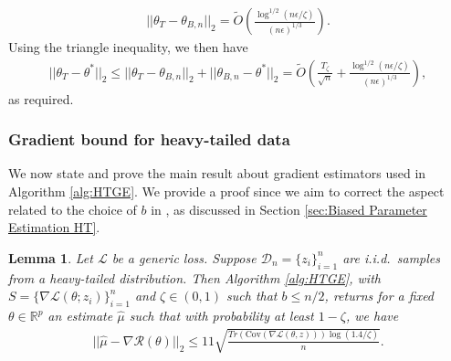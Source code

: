 \documentclass{article}
\newtheorem{lemma}{Lemma}
\newcommand{\iid}{i.i.d.{\ }}
\begin{document}
\begin{align*}
||\theta_T - \theta_{B, n}||_2 = \widetilde{O}\left(\frac{\log^{1/2}(n\epsilon/\zeta)}{(n\epsilon)^{1/3}}\right).
\end{align*}
Using the triangle inequality, we then have
\begin{align*}
||\theta_T - \theta^*||_2 \leq ||\theta_T - \theta_{B, n}||_2 + ||\theta_{B, n} - \theta^*||_2 = \widetilde{O}\left(\frac{T_\zeta}{\sqrt{n}} + \frac{\log^{1/2}(n\epsilon/\zeta)}{(n\epsilon)^{1/3}}\right),
\end{align*}
as required.


\subsubsection{Gradient bound for heavy-tailed data}
\label{AppLemHT}

We now state and prove the main result about gradient estimators used in Algorithm \ref{alg:HTGE}. We provide a proof since we aim to correct the aspect related to the choice of $b$ in \cite{RE}, as discussed in Section \ref{sec:Biased Parameter Estimation HT}.

\begin{lemma}
\label{lemma:htlemma}
Let $\mathcal{L}$ be a generic loss. Suppose $\mathcal{D}_n = \{z_i\}_{i = 1}^n$ are \iid samples from a heavy-tailed distribution. Then Algorithm \ref{alg:HTGE}, with $S = \{\nabla \mathcal{L}(\theta; z_i)\}_{i=1}^n$ and $\zeta \in (0, 1)$ such that $b \leq n/2$, returns for a fixed $\theta \in \mathbb{R}^p$ an estimate $\widehat{\mu}$ such that with probability at least $1 - \zeta$, we have
\begin{align*}
||\widehat{\mu} - \nabla\mathcal{R}(\theta)||_2 \leq 11\sqrt{\frac{Tr(\mathrm{\mathrm{Cov}}(\nabla \mathcal{L}(\theta, z)))\log(1.4/ \zeta)}{n}}.
\end{align*}
\end{lemma}
\end{document}
